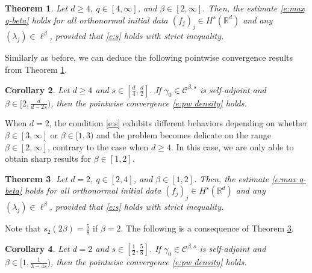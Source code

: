 \documentclass[a4paper]{amsart}
\numberwithin{figure}{section}
\numberwithin{equation}{section}%
\theoremstyle{plain}%
\newtheorem{theorem}{Theorem}[section]
\newtheorem{corollary}[theorem]{Corollary}
\theoremstyle{definition}
\theoremstyle{remark}%
\newcommand{\R}{{\mathbb R}}
\begin{document}
\begin{theorem}\label{t:max main4}  Let $d\ge 4$,  $q\in [4,\infty]$, and  $\beta\in [2,\infty]$.  
Then, the estimate \eqref{e:max q-beta} 
holds for all orthonormal initial data $(f_j)_j\in H^s(\R^d)$ and any $(\lambda_j)\in \ell^\beta$, provided that \eqref{e:s} holds with strict inequality. 
\end{theorem}

Similarly as before, we can deduce the following pointwise convergence results from Theorem \ref{t:max main4}.

\begin{corollary}\label{t:pw main4}
Let $d\geq 4$ and $s\in [\frac d4,  \frac d2] $.
If $\gamma_0\in \mathcal C^{\beta,s}$ is self-adjoint  and 
   $ \beta \in [2,\frac{d}{d-2s})$, 
     then the pointwise convergence \eqref{e:pw density} holds.
\end{corollary}




When $d=2$,  the condition \eqref{e:s} exhibits different behaviors depending on whether $\beta\in [3, \infty]$  or   $\beta\in [1, 3)$  and the problem becomes delicate on the range $\beta\in [2,\infty]$, contrary to the case when $d\ge 4$. 
In this case, we are only able to obtain sharp results for  $\beta\in [1,2]$. 




\begin{theorem}\label{t:max main2}  Let $d=2$,  $q\in [2,4]$, and  $\beta\in [1,2]$.  
Then, the estimate \eqref{e:max q-beta} 
holds for all orthonormal initial data $(f_j)_j\in H^s(\R^d)$ and any $(\lambda_j)\in \ell^\beta$, provided that \eqref{e:s} holds with strict inequality. 
\end{theorem}

 Note that $s_2(2\beta)=\frac5{8}$ if $\beta=2$.  The following is a consequence of Theorem \ref{t:max main2}. 
 
 
\begin{corollary}\label{t:pw main2}
Let $d=2$ and $s\in [\frac12,\frac 58]$. If $\gamma_0\in \mathcal C^{\beta,s}$ is self-adjoint  and $\beta \in [1,\frac{1}{3-4s})$,   
     then the pointwise convergence \eqref{e:pw density} holds.
\end{corollary}
\end{document}
